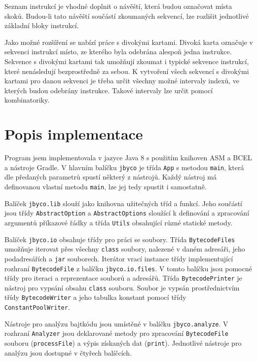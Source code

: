 Seznam instrukcí je vhodné doplnit o návěští, která budou označovat místa skoků. Budou-li tato návěští součástí zkoumaných sekvencí, lze rozlišit jednotlivé základní bloky instrukcí.

Jako možné rozšíření se nabízí práce s divokými kartami.
Divoká karta označuje v sekvenci instrukcí místo, ze kterého byla odebrána alespoň jedna instrukce. Sekvence s divokými kartami tak umožňují zkoumat i typické sekvence instrukcí, které nenásledují bezprostředně za sebou. K vytvoření všech sekvencí s divokými kartami pro danou sekvenci je třeba určit všechny možné intervaly indexů, ve kterých budou odebrány instrukce. Takové intervaly lze určit pomocí kombinatoriky.

\section{Popis implementace}\label{ToolImplementation}

Program jsem implementovala v jazyce Java 8 s použitím knihoven ASM a BCEL a nástroje Gradle. V hlavním balíčku \texttt{jbyco} je třída \texttt{App} s metodou \texttt{main}, která dle předaných parametrů spustí některý z nástrojů. Každý nástroj má definovanou vlastní metodu \texttt{main}, lze jej tedy spustit i samostatně.

Balíček \texttt{jbyco.lib} slouží jako knihovna užitečných tříd a funkcí. Jeho součástí jsou třídy \texttt{AbstractOption} a \texttt{AbstractOptions} sloužící k definování a zpracování argumentů příkazové řádky a třída \texttt{Utils} obsahující různé statické metody. 

Balíček \texttt{jbyco.io} obsahuje třídy pro práci se soubory. Třída \texttt{BytecodeFiles} umožňuje iterovat přes všechny \texttt{class} soubory, nalezené v daném adresáři, jeho podadresářích a \texttt{jar} souborech. Iterátor vrací instance třídy implementující rozhraní \texttt{BytecodeFile} z balíčku \texttt{jbyco.io.files}. V tomto balíčku jsou pomocné třídy pro iteraci a reprezentace souborů a adresářů. Třída \texttt{BytecodePrinter} je nástroj pro vypsání obsahu \texttt{class} souboru. Soubor je vypsán prostřednictvím třídy \texttt{BytecodeWriter} a jeho tabulka konstant pomocí třídy \texttt{ConstantPoolWriter}.  

Nástroje pro analýzu bajtkódu jsou umístěné v balíčku \texttt{jbyco.analyze}. V rozhraní \texttt{Analyzer} jsou deklarované metody pro zpracování \texttt{BytecodeFile} souboru (\texttt{processFile}) a výpis získaných dat (\texttt{print}). Jednotlivé nástroje pro analýzu jsou dostupné v čtyřech balíčcích.

